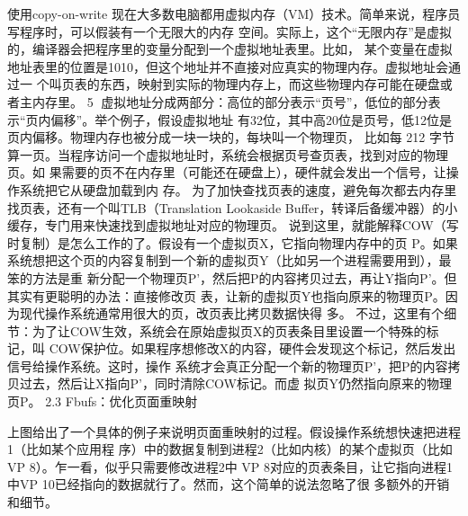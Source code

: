                     使用copy-on-write
现在大多数电脑都用虚拟内存（VM）技术。简单来说，程序员写程序时，可以假装有一个无限大的内存
空间。实际上，这个“无限内存”是虚拟的，编译器会把程序里的变量分配到一个虚拟地址表里。比如，
某个变量在虚拟地址表里的位置是1010，但这个地址并不直接对应真实的物理内存。虚拟地址会通过一
个叫页表的东西，映射到实际的物理内存上，而这些物理内存可能在硬盘或者主内存里。
                                                   5
虚拟地址分成两部分：高位的部分表示“页号”，低位的部分表示“页内偏移”。举个例子，假设虚拟地址
有32位，其中高20位是页号，低12位是页内偏移。物理内存也被分成一块一块的，每块叫一个物理页，
比如每 212 字节算一页。当程序访问一个虚拟地址时，系统会根据页号查页表，找到对应的物理页。如
果需要的页不在内存里（可能还在硬盘上），硬件就会发出一个信号，让操作系统把它从硬盘加载到内
存。
为了加快查找页表的速度，避免每次都去内存里找页表，还有一个叫TLB（Translation Lookaside
Buffer，转译后备缓冲器）的小缓存，专门用来快速找到虚拟地址对应的物理页。
说到这里，就能解释COW（写时复制）是怎么工作的了。假设有一个虚拟页X，它指向物理内存中的页
P。如果系统想把这个页的内容复制到一个新的虚拟页Y（比如另一个进程需要用到），最笨的方法是重
新分配一个物理页P'，然后把P的内容拷贝过去，再让Y指向P'。但其实有更聪明的办法：直接修改页
表，让新的虚拟页Y也指向原来的物理页P。因为现代操作系统通常用很大的页，改页表比拷贝数据快得
多。
不过，这里有个细节：为了让COW生效，系统会在原始虚拟页X的页表条目里设置一个特殊的标记，叫
COW保护位。如果程序想修改X的内容，硬件会发现这个标记，然后发出信号给操作系统。这时，操作
系统才会真正分配一个新的物理页P'，把P的内容拷贝过去，然后让X指向P'，同时清除COW标记。而虚
拟页Y仍然指向原来的物理页P。
2.3 Fbufs：优化页面重映射




上图给出了一个具体的例子来说明页面重映射的过程。假设操作系统想快速把进程1（比如某个应用程
序）中的数据复制到进程2（比如内核）的某个虚拟页（比如VP 8）。乍一看，似乎只需要修改进程2中
VP 8对应的页表条目，让它指向进程1中VP 10已经指向的数据就行了。然而，这个简单的说法忽略了很
多额外的开销和细节。

